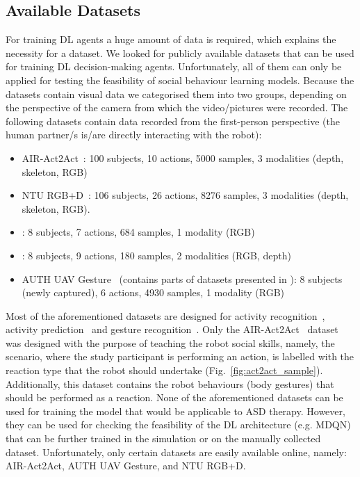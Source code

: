 \documentclass[thesis]{mas_proposal}
\begin{document}
\subsection{Available Datasets}
 For training DL agents a huge amount of data is required, which explains the necessity for a dataset. We looked for publicly available datasets that can be used for training DL decision-making agents. Unfortunately, all of them can only be applied for testing the feasibility of social behaviour learning models. Because the datasets contain visual data we categorised them into two groups, depending on the perspective of the camera from which the video/pictures were recorded. The following datasets contain data recorded from the first-person perspective (the human partner/s is/are directly interacting with the robot):
\begin{itemize}
	\item AIR-Act2Act~\cite{Ko2021}: 100 subjects, 10 actions, 5000 samples, 3 modalities (depth, skeleton, RGB)
	\item NTU RGB+D~\cite{Shahroudy_2016_CVPR,Liu2020}: 106 subjects, 26 actions, 8276 samples, 3 modalities (depth, skeleton, RGB).
	\item \cite{ryoo2013firstperson}: 8 subjects, 7 actions, 684 samples, 1 modality (RGB) 
	\item \cite{ryoo2015robot}: 8 subjects, 9 actions, 180 samples, 2 modalities (RGB, depth)
	\item AUTH UAV Gesture~\cite{patrona2021overview} (contains parts of datasets presented in \cite{Shahroudy_2016_CVPR,Perera_2018_ECCV_Workshops}): 8 subjects (newly captured), 6 actions, 4930 samples, 1 modality (RGB) 
\end{itemize}

Most of the aforementioned datasets are designed for activity recognition~\cite{Shahroudy_2016_CVPR,Liu2020,ryoo2013firstperson}, activity prediction~\cite{ryoo2015robot} and gesture recognition~\cite{patrona2021overview}. Only the AIR-Act2Act~\cite{Ko2021} dataset was designed with the purpose of teaching the robot social skills, namely, the scenario, where the study participant is performing an action, is labelled with the reaction type that the robot should undertake (Fig.~\ref{fig:act2act_sample}). Additionally, this dataset contains the robot behaviours (body gestures) that should be performed as a reaction. None of the aforementioned datasets can be used for training the model that would be applicable to ASD therapy. However, they can be used for checking the feasibility of the DL architecture (e.g. MDQN) that can be further trained in the simulation or on the manually collected dataset. Unfortunately, only certain datasets are easily available online, namely: AIR-Act2Act, AUTH UAV Gesture, and NTU RGB+D.
\end{document}
